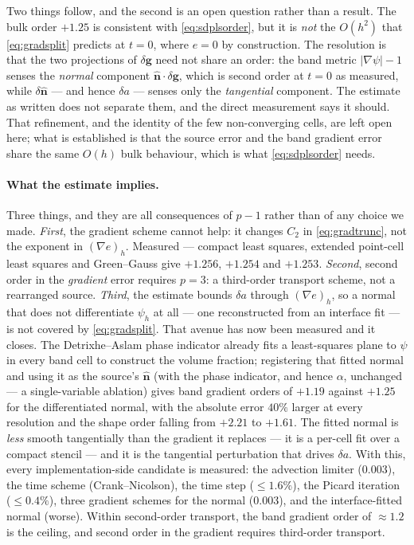 \documentclass[preprint,3p,11pt]{elsarticle}
\newcommand{\psilev}{\psi}
\newcommand{\nhat}{\hat{\mathbf{n}}}
\newcommand{\gradpsi}{\lvert\nabla\psilev\rvert}
\begin{document}
Two things follow, and the second is an open question rather than a result.
The bulk order $+1.25$ is consistent with \eqref{eq:sdplsorder}, but it is
\emph{not} the $O(h^2)$ that \eqref{eq:gradsplit} predicts at $t=0$, where
$e=0$ by construction. The resolution is that the two projections of
$\delta\mathbf{g}$ need not share an order: the band metric
$\gradpsi-1$ senses the \emph{normal} component $\nhat\cdot\delta\mathbf{g}$,
which is second order at $t=0$ as measured, while $\delta\nhat$ --- and hence
$\delta a$ --- senses only the \emph{tangential} component. The estimate as
written does not separate them, and the direct measurement says it should. That
refinement, and the identity of the few non-converging cells, are left open
here; what is established is that the source error and the band gradient error
share the same $O(h)$ bulk behaviour, which is what
\eqref{eq:sdplsorder} needs.

\paragraph{What the estimate implies.}
Three things, and they are all consequences of $p-1$ rather than of any choice
we made. \emph{First}, the gradient scheme cannot help: it changes $C_2$ in
\eqref{eq:gradtrunc}, not the exponent in $(\nabla e)_h$. Measured --- compact
least squares, extended point-cell least squares and Green--Gauss give
$+1.256$, $+1.254$ and $+1.253$. \emph{Second}, second order in the
\emph{gradient} error requires $p=3$: a third-order transport scheme, not a
rearranged source. \emph{Third}, the estimate bounds $\delta a$ through
$(\nabla e)_h$, so a normal that does not differentiate $\psilev_h$ at all ---
one reconstructed from an interface fit --- is not covered by
\eqref{eq:gradsplit}. That avenue has now been measured and it closes. The
Detrixhe--Aslam phase indicator already fits a least-squares plane to
$\psilev$ in every band cell to construct the volume fraction; registering that
fitted normal and using it as the source's $\nhat$ (with the phase indicator,
and hence $\alpha$, unchanged --- a single-variable ablation) gives band
gradient orders of $+1.19$ against $+1.25$ for the differentiated normal, with
the absolute error $40\%$ larger at every resolution and the shape order
falling from $+2.21$ to $+1.61$. The fitted normal is \emph{less} smooth
tangentially than the gradient it replaces --- it is a per-cell fit over a
compact stencil --- and it is the tangential perturbation that drives
$\delta a$. With this, every implementation-side candidate is measured: the
advection limiter ($0.003$), the time scheme (Crank--Nicolson), the time step
($\le1.6\%$), the Picard iteration ($\le0.4\%$), three gradient schemes for the
normal ($0.003$), and the interface-fitted normal (worse). Within second-order
transport, the band gradient order of $\approx1.2$ is the ceiling, and second
order in the gradient requires third-order transport.
\end{document}
